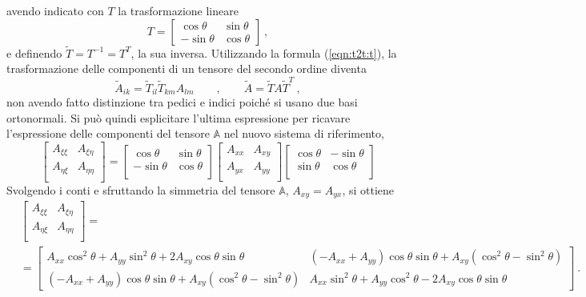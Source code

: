 avendo indicato con $T$ la trasformazione lineare
\begin{equation}
 T = 
\begin{bmatrix}
 \cos{\theta} & \sin{\theta} \\
-\sin{\theta} & \cos{\theta} 
\end{bmatrix} \ ,
\end{equation}
e definendo $\tilde{T}=T^{-1}=T^T$, la sua inversa. Utilizzando la formula (\ref{eqn:t2t:t}), la trasformazione delle componenti di un tensore del secondo ordine diventa
\begin{equation}
    \tilde{A}_{ik} = \tilde{T}_{il} \tilde{T}_{km} A_{lm} \qquad , \qquad
    \tilde{A} = \tilde{T} A \tilde{T}^T \ ,
\end{equation}
non avendo fatto distinzione tra pedici e indici poiché si usano due basi ortonormali.
Si può quindi esplicitare l'ultima espressione per ricavare l'espressione delle componenti del tensore $\mathbb{A}$ nel nuovo sistema di riferimento,
 \begin{equation}
   \begin{bmatrix}
    A_{\xi \xi} & A_{\xi \eta} \\
    A_{\eta\xi} & A_{\eta\eta} \\
   \end{bmatrix} = 
   \begin{bmatrix} 
    \cos{\theta} & \sin{\theta} \\
   -\sin{\theta} & \cos{\theta} \\
   \end{bmatrix}
   \begin{bmatrix}
    A_{xx} & A_{xy} \\
    A_{yx} & A_{yy} \\
   \end{bmatrix}
   \begin{bmatrix} 
    \cos{\theta} &-\sin{\theta} \\
   \sin{\theta} & \cos{\theta} \\
   \end{bmatrix}
 \end{equation}
Svolgendo i conti e sfruttando la simmetria del tensore $\mathbb{A}$, $A_{xy} = A_{yx}$, si ottiene
  \begin{equation}
  \begin{aligned}
& \begin{bmatrix}
    A_{\xi \xi} & A_{\xi \eta} \\
    A_{\eta\xi} & A_{\eta\eta} \\
   \end{bmatrix} = \\ 
   & = \begin{bmatrix}
    A_{xx} \cos^2 \theta + A_{yy} \sin^2 \theta + 2 A_{xy} \cos \theta \sin \theta & 
      (-A_{xx} + A_{yy}) \cos \theta \sin \theta + A_{xy} ( \cos^2 \theta - \sin^2 \theta) \\
  (-A_{xx} + A_{yy}) \cos \theta \sin \theta + A_{xy} ( \cos^2 \theta - \sin^2 \theta) &
      A_{xx} \sin^2 \theta + A_{yy} \cos^2 \theta - 2 A_{xy} \cos \theta \sin \theta 
   \end{bmatrix} \ .
 \end{aligned}
 \end{equation}
